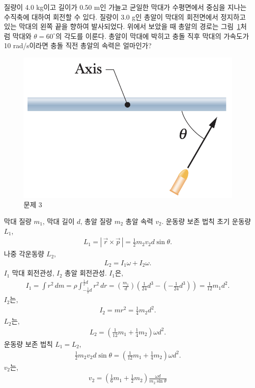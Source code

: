 \documentclass[floatfix,nofootinbib,superscriptaddress,fleqn]{revtex4-2}
\begin{document}
\vspace{1.cm}


질량이 4.0 kg이고 길이가 0.50 m인 가늘고 균일한 막대가 수평면에서
중심을 지나는 수직축에 대하여 회전할 수 있다. 질량이 3.0 g인 총알이
막대의 회전면에서 정지하고 있는 막대의 왼쪽 끝을 향하여
발사되었다. 위에서 보았을 때 총알의 경로는 그림~\ref{fig:3}처럼 막대와
$\theta=60^\circ$의 각도를 이룬다. 총알이 막대에 박히고 충돌 직후
막대의 가속도가 10 rad/s이라면 충돌 직전 총알의 속력은 얼마인가? 
\begin{figure}[ht]
  \centering
\includegraphics[scale=0.4]{Qfig14-3-20220427.png}
  \caption{문제 3}
  \label{fig:3}
\end{figure}

막대 질량 $m_1$, 막대 길이 $d$, 총알 질량 $m_2$ 총알 속력 $v_2$.
운동량 보존 법칙 초기 운동량 $L_1$,
\begin{align}
  L_1 =|\,\vec{r}\times\vec{p}\,|=\frac{1}{2} m_2v_2d\sin\theta.
\end{align}
나중 각운동량 $L_2$,
\begin{align}
  L_2 = I_1\omega+ I_2\omega.
\end{align}
$I_1$ 막대 회전관성, $I_2$ 총알 회전관성. $I_1$은,
\begin{align}
  I_1 = \int r^2\,dm = \rho\int_{-\frac{1}{2}d} ^{\frac{1}{2}d}r^2\,dr
  =\left(\frac{m_1}{d}\right)\left(\frac{1}{24}d^3
  -\left(-\frac{1}{24}d^3\right)\right)
  =\frac{1}{12}m_1d^2.
\end{align}
$I_2$는,
\begin{align}
  I_2 =  mr^2 = \frac{1}{4}m_2d^2.
\end{align}
$L_2$는,
\begin{align}
  L_2 = \left(\frac{1}{12}m_1+\frac{1}{4}m_2\right)\omega d^2.
\end{align}
운동량 보존 법칙 $L_1=L_2$,
\begin{align}
  \frac{1}{2}m_2v_2d\sin\theta=\left(\frac{1}{12}m_1
  +\frac{1}{4}m_2\right)\omega d^2.
\end{align}
$v_2$는,
\begin{align}
  v_2 = \left(\frac{1}{6}m_1+\frac{1}{2}m_2\right)\frac{\omega d}{m_2\sin\theta}
\end{align}
\end{document}
